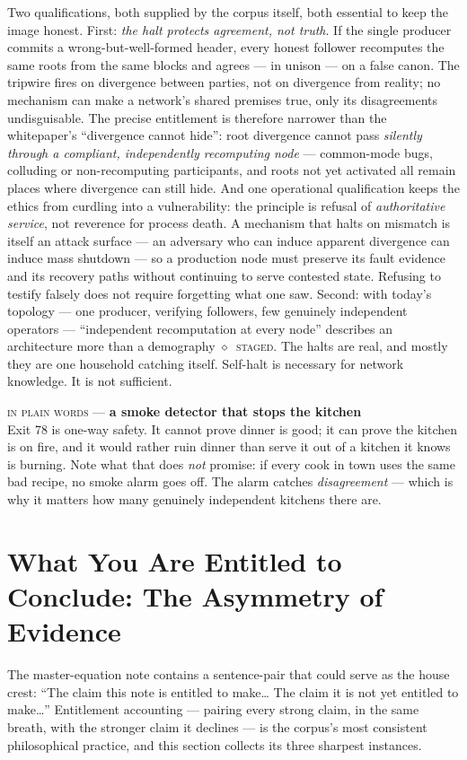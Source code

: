 \documentclass[10pt,a4paper]{article}
\newcommand{\stG}{\textcolor{sigilviolet}{$\diamond$}~{\scriptsize\textcolor{sigilviolet}{\textsc{staged}}}}
\newcommand{\layman}[3]{%
\begin{tcolorbox}[enhanced,
  interior style={left color=#1!9,right color=white},
  colframe=#1!45!slate,boxrule=0.5pt,arc=3pt,
  borderline west={2.5pt}{0pt}{#1},
  left=9pt,right=9pt,top=7pt,bottom=7pt]
{\scriptsize\textcolor{#1}{\textsc{in plain words}}\; — \;\textbf{\small #2}}\\[3pt]
\small #3
\end{tcolorbox}}
\begin{document}
Two qualifications, both supplied by the corpus itself, both essential to keep the
image honest. First: \emph{the halt protects agreement, not truth}. If the single
producer commits a wrong-but-well-formed header, every honest follower recomputes
the same roots from the same blocks and agrees — in unison — on a false canon. The
tripwire fires on divergence between parties, not on divergence from reality; no
mechanism can make a network's shared premises true, only its disagreements
undisguisable. The precise entitlement is therefore narrower than the whitepaper's
``divergence cannot hide'': root divergence cannot pass \emph{silently through a
compliant, independently recomputing node} — common-mode bugs, colluding or
non-recomputing participants, and roots not yet activated all remain places where
divergence can still hide. And one operational qualification keeps the ethics from
curdling into a vulnerability: the principle is refusal of \emph{authoritative
service}, not reverence for process death. A mechanism that halts on mismatch is
itself an attack surface — an adversary who can induce apparent divergence can
induce mass shutdown — so a production node must preserve its fault evidence and
its recovery paths without continuing to serve contested state. Refusing to
testify falsely does not require forgetting what one saw. Second: with today's topology — one producer, verifying followers,
few genuinely independent operators — ``independent recomputation at every node''
describes an architecture more than a demography \stG. The halts are real, and
mostly they are one household catching itself. Self-halt is necessary
for network knowledge. It is not sufficient.

\layman{sigilamber}{a smoke detector that stops the kitchen}{Exit 78 is one-way
safety. It cannot prove dinner is good; it can prove the kitchen is on fire, and it
would rather ruin dinner than serve it out of a kitchen it knows is burning. Note what
that does \emph{not} promise: if every cook in town uses the same bad recipe, no
smoke alarm goes off. The alarm catches \emph{disagreement} — which is why it
matters how many genuinely independent kitchens there are.}

\section{What You Are Entitled to Conclude: The Asymmetry of Evidence}\label{sec:entitlement}

The master-equation note contains a sentence-pair that could serve as the house
crest: ``The claim this note is entitled to make\ldots{} The claim it is not yet
entitled to make\ldots'' Entitlement accounting — pairing every strong claim, in the
same breath, with the stronger claim it declines — is the corpus's most consistent
philosophical practice, and this section collects its three sharpest instances.
\end{document}
